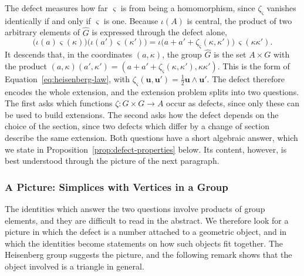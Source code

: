 The defect measures how far $\varsigma$ is from being a homomorphism, since $\zeta_\varsigma$ vanishes identically if and only if $\varsigma$ is one. Because $\iota(A)$ is central, the product of two arbitrary elements of $\widehat{G}$ is expressed through the defect alone,
\begin{equation}\label{eq:product-defect}
	\big(\iota(a)\varsigma(\kappa)\big)\big(\iota(a')\varsigma(\kappa')\big)=\iota\big(a+a'+\zeta_\varsigma(\kappa,\kappa')\big)\,\varsigma(\kappa\kappa').
\end{equation}
It descends that, in the coordinates $(a,\kappa)$, the group $\widehat{G}$ is the set $A\times G$ with the product $(a,\kappa)(a',\kappa')=(a+a'+\zeta_\varsigma(\kappa,\kappa'),\kappa\kappa')$. This is the form of Equation~\eqref{eq:heisenberg-law}, with $\zeta_\varsigma(\mathbf{u},\mathbf{u}')=\tfrac12\mathbf{u}\wedge\mathbf{u}'$. The defect therefore encodes the whole extension, and the extension problem splits into two questions. The first asks which functions $\zeta:G\times G\to A$ occur as defects, since only these can be used to build extensions. The second asks how the defect depends on the choice of the section, since two defects which differ by a change of section describe the same extension. Both questions have a short algebraic answer, which we state in Proposition~\ref{prop:defect-properties} below. Its content, however, is best understood through the picture of the next paragraph.

\subsubsection*{A Picture: Simplices with Vertices in a Group}

The identities which answer the two questions involve products of group elements, and they are difficult to read in the abstract. We therefore look for a picture in which the defect is a number attached to a geometric object, and in which the identities become statements on how such objects fit together. The Heisenberg group suggests the picture, and the following remark shows that the object involved is a triangle in general.

